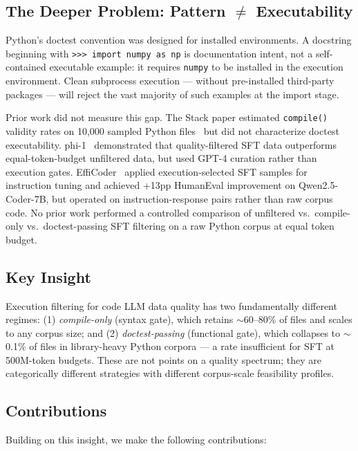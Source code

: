 \subsection{The Deeper Problem: Pattern $\neq$ Executability}

Python's doctest convention was designed for installed environments. A docstring beginning
with \texttt{>>> import numpy as np} is documentation intent, not a self-contained executable
example: it requires \texttt{numpy} to be installed in the execution environment. Clean subprocess
execution --- without pre-installed third-party packages --- will reject the vast majority of
such examples at the import stage.

Prior work did not measure this gap. The Stack paper estimated \texttt{compile()} validity rates
on 10,000 sampled Python files~\cite{Kocetkov2022Stack} but did not characterize doctest
executability. phi-1~\cite{Gunasekar2023Textbooks} demonstrated that quality-filtered SFT
data outperforms equal-token-budget unfiltered data, but used GPT-4 curation rather than
execution gates. EffiCoder~\cite{Zeng2024EffiCoder} applied execution-selected SFT samples
for instruction tuning and achieved +13pp HumanEval improvement on Qwen2.5-Coder-7B,
but operated on instruction-response pairs rather than raw corpus code. No prior work
performed a controlled comparison of unfiltered vs.\ compile-only vs.\ doctest-passing SFT
filtering on a raw Python corpus at equal token budget.

\subsection{Key Insight}

Execution filtering for code LLM data quality has two fundamentally different regimes:
(1) \emph{compile-only} (syntax gate), which retains $\sim$60--80\% of files and scales to any
corpus size; and (2) \emph{doctest-passing} (functional gate), which collapses to $\sim$0.1\%
of files in library-heavy Python corpora --- a rate insufficient for SFT at 500M-token budgets.
These are not points on a quality spectrum; they are categorically different strategies
with different corpus-scale feasibility profiles.

\subsection{Contributions}

Building on this insight, we make the following contributions:

